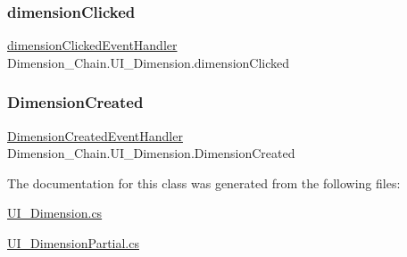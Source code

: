 \subsubsection{\texorpdfstring{dimension\+Clicked}{dimensionClicked}}
{\footnotesize\ttfamily \mbox{\hyperlink{class_dimension___chain_1_1_u_i___dimension_a45fef985621de3e250d8343eeeca3aed}{dimension\+Clicked\+Event\+Handler}} Dimension\+\_\+\+Chain.\+U\+I\+\_\+\+Dimension.\+dimension\+Clicked}

\mbox{\label{class_dimension___chain_1_1_u_i___dimension_ad20f8fb74391f34b390ed237e6bf054e}} 
\subsubsection{\texorpdfstring{Dimension\+Created}{DimensionCreated}}
{\footnotesize\ttfamily \mbox{\hyperlink{class_dimension___chain_1_1_u_i___dimension_a106096e0c35875f5fab0e7f22e0b5941}{Dimension\+Created\+Event\+Handler}} Dimension\+\_\+\+Chain.\+U\+I\+\_\+\+Dimension.\+Dimension\+Created\hspace{0.3cm}{\ttfamily [static]}}



The documentation for this class was generated from the following files\+:\begin{DoxyCompactItemize}
\item 
\mbox{\hyperlink{_u_i___dimension_8cs}{U\+I\+\_\+\+Dimension.\+cs}}\item 
\mbox{\hyperlink{_u_i___dimension_partial_8cs}{U\+I\+\_\+\+Dimension\+Partial.\+cs}}\end{DoxyCompactItemize}
